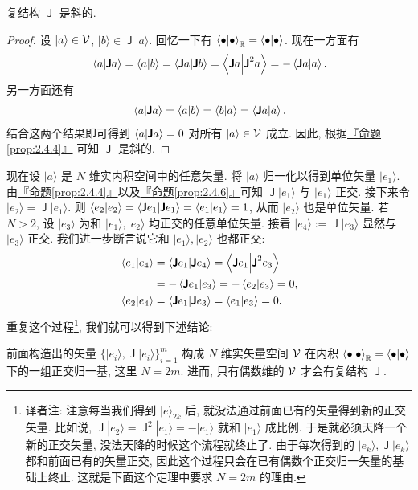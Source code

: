 \documentclass[lang=cn,zihao=-4,twoside,fontset=none]{textbook}
\newcommand{\gt}{>}
\newcommand{\bsf}[1]{{\mathop{\pmb{\mathsf{#1}}}}}
\def\eq#1{\[\begin{aligned}{}#1\end{aligned}\]}
\newcommand{\propref}[1]{\hyperref[#1]{『命题\textnormal{\ref*{#1}}』}}
\newcommand{\set}[1]{\{#1\}}
\renewcommand{\ket}[1]{| #1 \rangle}
\begin{document}
\begin{prop}
    \label{prop:2.4.6}%
    复结构 $\bsf{J}$ 是斜的.
\end{prop}

\begin{proof}
    设 $\ket{a}\in\mV$, $\ket{b}\in\bsf{J}\ket{a}$. 回忆一下有 $\braket{\bullet}{\bullet}_{{\mathbb R}}=\braket{\bullet}{\bullet}$. 现在一方面有 
    \eq{
        \braket{a }{\bsf J a}=\braket{a }{b}=\braket{\bsf J a }{\bsf J b}=\braket{\bsf J a }{\bsf J^2 a }=-\braket{\bsf J a}{a }.
    }
    另一方面还有 
    \eq{
        \braket{a }{\bsf J a}=\braket{a }{b}=\braket{b }{a}=\braket{\bsf J a }{a}.
    }
    结合这两个结果即可得到 $\braket{a }{\bsf J a}=0$ 对所有 $\ket{a}\in\mV$ 成立. 因此, 根据\propref{prop:2.4.4} 可知 $\bsf J$ 是斜的. 
\end{proof}

现在设 $\ket{a}$ 是 $N$ 维实内积空间中的任意矢量. 将 $\ket{a}$ 归一化以得到单位矢量 $\ket{e_1}$. 由\propref{prop:2.4.4}以及\propref{prop:2.4.6}可知 $\bsf{J}\ket{e_1}$ 与 $\ket{e_1}$ 正交. 接下来令 $\ket{e_2}=\bsf{J}\ket{e_1}$. 则 $\braket{e_2}{e_2}=\braket{\bsf J e_1}{\bsf Je_1}=\braket{e_1}{e_1}=1$, 从而 $\ket{e_2}$ 也是单位矢量. 若 $N\gt 2$, 设 $\ket{e_3}$ 为和 $\ket{e_1},\ket{e_2}$ 均正交的任意单位矢量. 接着 $\ket{e_4}:=\bsf{J}\ket{e_3}$ 显然与 $\ket{e_3}$ 正交. 我们进一步断言说它和 $\ket{e_1},\ket{e_2}$ 也都正交:
\eq{
    \braket{e_1}{e_4}&=\braket{\bsf J e_1 }{\bsf Je_4}=\braket{\bsf Je_1 }{\bsf J^2e_3}\\
    &=-\braket{\bsf Je_1}{e_3}= -\braket{e_2}{e_3}=0,\\
    \braket{e_2}{e_4}&= \braket{\bsf J e_1}{\bsf Je_3}=\braket{e_1}{e_3}=0.
}
重复这个过程\footnote{译者注: 注意每当我们得到 $\ket{e}_{2k}$ 后, 就没法通过前面已有的矢量得到新的正交矢量. 比如说, $\bsf{J}\ket{e_2}=\bsf J^2\ket{e_1}=-\ket{e_1}$ 就和 $\ket{e_1}$ 成比例. 于是就必须天降一个新的正交矢量, 没法天降的时候这个流程就终止了. 由于每次得到的 $\ket{e_k},\bsf{J}\ket{e_k}$ 都和前面已有的矢量正交, 因此这个过程只会在已有偶数个正交归一矢量的基础上终止. 这就是下面这个定理中要求 $N=2m$ 的理由.}, 我们就可以得到下述结论:

\begin{theorem}
    \label{thm:2.4.7}%
    前面构造出的矢量 $\set{\ket{e_i},\bsf{J}\ket{e_i}}_{i=1}^m$ 构成 $N$ 维实矢量空间 ${\mathcal V}$ 在内积 $\braket{\bullet}{\bullet}_{\mathbb R}=\braket{\bullet}{\bullet}$ 下的一组正交归一基, 这里 $N=2m$. 进而, 只有偶数维的 ${\mathcal V}$ 才会有复结构 $\bsf J$. 
\end{theorem}
\end{document}
